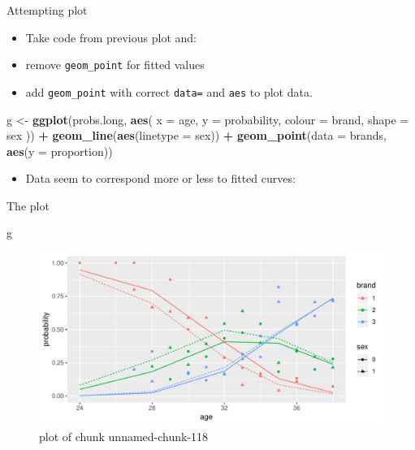 \documentclass[ignorenonframetext,]{beamer}
\newenvironment{Shaded}{\begin{snugshade}}{\end{snugshade}}
\newcommand{\DataTypeTok}[1]{\textcolor[rgb]{0.13,0.29,0.53}{#1}}
\newcommand{\KeywordTok}[1]{\textcolor[rgb]{0.13,0.29,0.53}{\textbf{#1}}}
\newcommand{\NormalTok}[1]{#1}
\newcommand{\OperatorTok}[1]{\textcolor[rgb]{0.81,0.36,0.00}{\textbf{#1}}}
\newcommand{\StringTok}[1]{\textcolor[rgb]{0.31,0.60,0.02}{#1}}
\providecommand{\tightlist}{%
  \setlength{\itemsep}{0pt}\setlength{\parskip}{0pt}}
\begin{document}
\begin{frame}[fragile]{Attempting plot}
\protect\hypertarget{attempting-plot}{}

\begin{itemize}
\item
  Take code from previous plot and:
\item
  remove \texttt{geom\_point} for fitted values
\item
  add \texttt{geom\_point} with correct \texttt{data=} and \texttt{aes}
  to plot data.
\end{itemize}

\begin{Shaded}
\begin{Highlighting}[]
\NormalTok{g <-}\StringTok{ }\KeywordTok{ggplot}\NormalTok{(probs.long, }\KeywordTok{aes}\NormalTok{(}
  \DataTypeTok{x =}\NormalTok{ age, }\DataTypeTok{y =}\NormalTok{ probability,}
  \DataTypeTok{colour =}\NormalTok{ brand, }\DataTypeTok{shape =}\NormalTok{ sex}
\NormalTok{)) }\OperatorTok{+}
\StringTok{  }\KeywordTok{geom_line}\NormalTok{(}\KeywordTok{aes}\NormalTok{(}\DataTypeTok{linetype =}\NormalTok{ sex)) }\OperatorTok{+}
\StringTok{  }\KeywordTok{geom_point}\NormalTok{(}\DataTypeTok{data =}\NormalTok{ brands, }\KeywordTok{aes}\NormalTok{(}\DataTypeTok{y =}\NormalTok{ proportion))}
\end{Highlighting}
\end{Shaded}

\begin{itemize}
\tightlist
\item
  Data seem to correspond more or less to fitted curves:
\end{itemize}

\end{frame}

\begin{frame}[fragile]{The plot}
\protect\hypertarget{the-plot-2}{}

\begin{Shaded}
\begin{Highlighting}[]
\NormalTok{g}
\end{Highlighting}
\end{Shaded}

\begin{figure}
\centering
\includegraphics{figure/unnamed-chunk-118-1.pdf}
\caption{plot of chunk unnamed-chunk-118}
\end{figure}

\end{frame}
\end{document}
